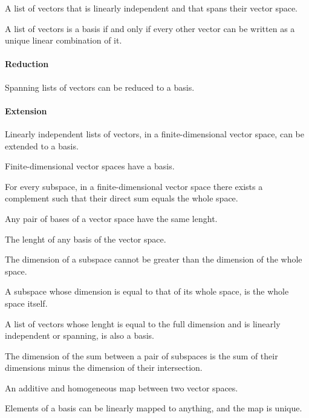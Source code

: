 \begin{multicols}{3}
  A list of vectors that is linearly independent and that spans their vector space.
  
  A list of vectors is a basis if and only if every other vector can be written as a unique linear combination of it.
  
  \paragraph{\textbf{Reduction}}
  Spanning lists of vectors can be reduced to a basis.
  \paragraph{\textbf{Extension}}
  Linearly independent lists of vectors, in a finite-dimensional vector space, can be extended to a basis.

  Finite-dimensional vector spaces have a basis.
  
  For every subspace, in a finite-dimensional vector space there exists a complement such that their direct sum equals the whole space.
  
  Any pair of bases of a vector space have the same lenght.
  
  The lenght of any basis of the vector space.
  
  The dimension of a subspace cannot be greater than the dimension of the whole space.
  
  A subspace whose dimension is equal to that of its whole space, is the whole space itself.
  
  A list of vectors whose lenght is equal to the full dimension and is linearly independent or spanning, is also a basis.
  
  The dimension of the sum between a pair of subspaces is the sum of their dimensions minus the dimension of their intersection.

  An additive and homogeneous map between two vector spaces.

  Elements of a basis can be linearly mapped to anything, and the map is unique.


\end{multicols}
